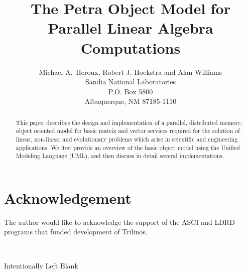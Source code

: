 \documentclass[12pt,relax]{PetraObjectModel}
\title{The Petra Object Model for Parallel Linear Algebra Computations}
\author{Michael A.~Heroux, Robert J. Hoekstra and Alan Williams \\
	   Sandia National Laboratories\\
	   P.O. Box 5800\\
	   Albuquerque, NM 87185-1110
	 }
\date{}
\begin{document}
\maketitle

\begin{abstract}
This paper describes the design and implementation of a parallel, 
distributed memory, object oriented model for basic
matrix and vector services required for the solution of linear, 
non-linear and evolutionary problems which arise in scientific 
and engineering applications.  We first provide an overview of 
the basic object model using the Unified Modeling Language (UML), 
and then discuss in detail several implementations.
\end{abstract}


\clearpage
\section*{Acknowledgement}
The author would like to acknowledge the support of the ASCI and LDRD programs
that funded development of Trilinos.

\newpage
\
\vspace{3.5in}
\begin{center}Intentionally Left Blank\end{center}
\clearpage
\tableofcontents
\listoffigures

\clearpage
{}
\end{document}
